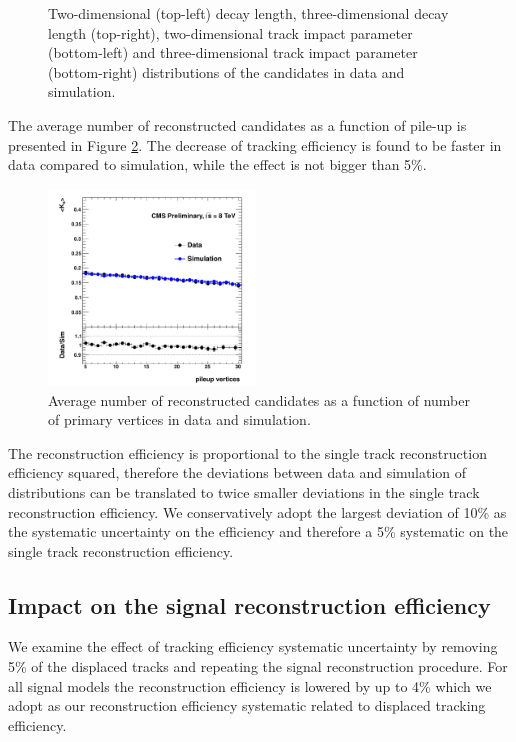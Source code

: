 \begin{figure}[htbp]
\caption{Two-dimensional (top-left) decay length, three-dimensional decay length (top-right), two-dimensional track impact parameter (bottom-left) and three-dimensional track impact parameter (bottom-right) distributions 
of the \Kshort candidates in data and simulation. \label{fig:ksdisplacement}}
\end{figure}

The average number of 
reconstructed \Kshort candidates as a function of pile-up is presented in Figure \ref{fig:kspileup}. 
The decrease of tracking efficiency is found to be faster in data compared to simulation, while the 
effect is not bigger than 5\%.

\begin{figure}[htbp]
\centering
\includegraphics[width=0.49\textwidth]{plots/kshort/effnPV.pdf}
\caption{Average number of reconstructed \Kshort candidates as a function of number of primary vertices in data and simulation. \label{fig:kspileup}}
\end{figure}

The \Kshort reconstruction efficiency is proportional to the single track reconstruction efficiency squared, 
therefore the deviations between data and simulation of \Kshort distributions can be translated to twice smaller 
deviations in the single track reconstruction efficiency. We conservatively adopt the largest deviation 
of 10\% as the systematic uncertainty on the \Kshort efficiency and therefore a 5\% systematic on the 
single track reconstruction efficiency. 

\subsection{Impact on the signal reconstruction efficiency}

We examine the effect of tracking efficiency systematic uncertainty by removing 5\% of the displaced tracks 
 and repeating the signal reconstruction procedure.
For all signal models the reconstruction efficiency is lowered by up to 4\% which we adopt as our reconstruction
efficiency systematic related to displaced tracking efficiency.  

